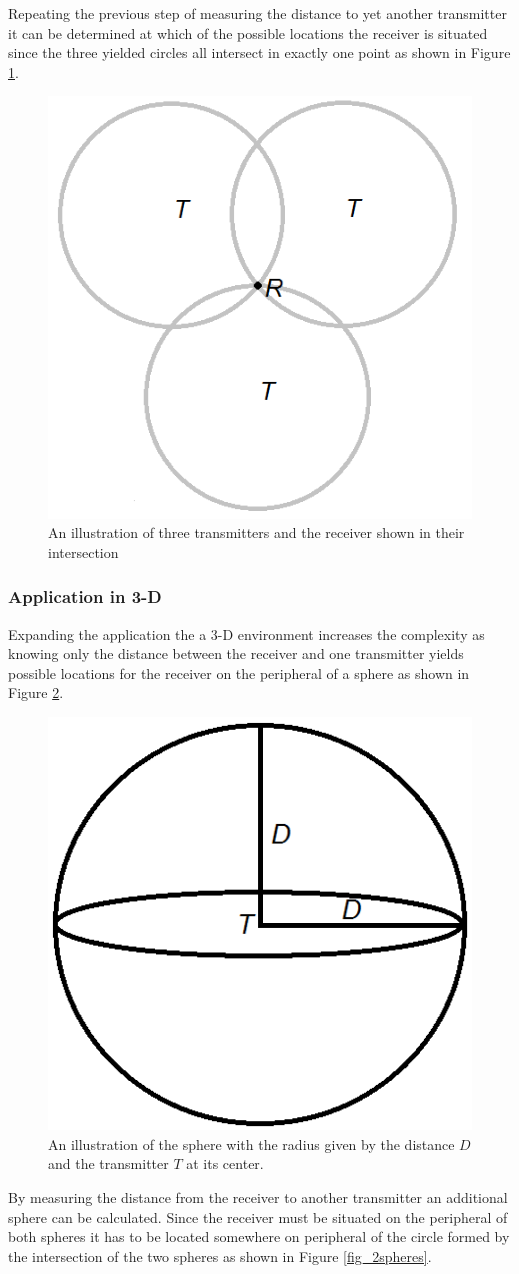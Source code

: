 			Repeating the previous step of measuring the distance to yet another transmitter it can be determined at which of the possible locations the receiver is situated since the three yielded circles all intersect in exactly one point as shown in Figure \ref{fig_3circles}.

			\begin{figure}[H] 
			  \centering
			      \includegraphics[height=0.45\textwidth]{img/3Circles}
			  \caption{An illustration of three transmitters and the receiver shown in their intersection}
			  \label{fig_3circles}
			\end{figure}

		\subsubsection{Application in 3-D}
			Expanding the application the a 3-D environment increases the complexity as knowing only the distance between the receiver and one transmitter yields possible locations for the receiver on the peripheral of a sphere as shown in Figure \ref{fig_sphere}.
			\begin{figure}[H] 
			  \centering
			      \includegraphics[height=0.25\textwidth]{img/Sphere}
			  \caption{An illustration of the sphere with the radius given by the distance $D$ and the transmitter $T$ at its center.}
			  \label{fig_sphere}
			\end{figure}

			By measuring the distance from the receiver to another transmitter an additional sphere can be calculated. Since the receiver must be situated on the peripheral of both spheres it has to be located somewhere on peripheral of the circle formed by the intersection of the two spheres as shown in Figure \ref{fig_2spheres}.

